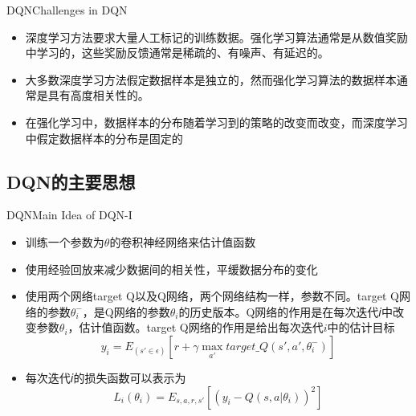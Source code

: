 \documentclass[10pt]{beamer}
\begin{document}
	\begin{frame}{DQN}{Challenges in DQN}
		\begin{itemize}
			\item<2-> 深度学习方法要求大量人工标记的训练数据。强化学习算法通常是从数值奖励中学习的，这些奖励反馈通常是稀疏的、有噪声、有延迟的。
			
			\item<3-> 大多数深度学习方法假定数据样本是独立的，然而强化学习算法的数据样本通常是具有高度相关性的。
			
			\item<4-> 在强化学习中，数据样本的分布随着学习到的策略的改变而改变，而深度学习中假定数据样本的分布是固定的
			
		\end{itemize}
	\end{frame}

	\subsection{DQN的主要思想}

	\begin{frame}{DQN}{Main Idea of DQN-I}
		\begin{itemize}
			\item 训练一个参数为$\theta$的卷积神经网络来估计值函数
			
			\item 使用经验回放来减少数据间的相关性，平缓数据分布的变化
			
			\item 使用两个网络target Q以及Q网络，两个网络结构一样，参数不同。target Q网络的参数$\theta_i^-$，是Q网络的参数$\theta_i$的历史版本。Q网络的作用是在每次迭代𝑖中改变参数$\theta_i$，估计值函数。target Q网络的作用是给出每次迭代$i$中的估计目标
			\[y_i = E_(s' \in \epsilon)[r + \gamma \max_{a'} target\_Q(s',a',\theta_i^-)] \]
			
			\item 每次迭代𝑖的损失函数可以表示为
			\[L_i(\theta_i) = E_{s,a,r,s'}[(y_i - Q(s,a| \theta_i))^2] \]
			
		\end{itemize}
	\end{frame}
\end{document}
